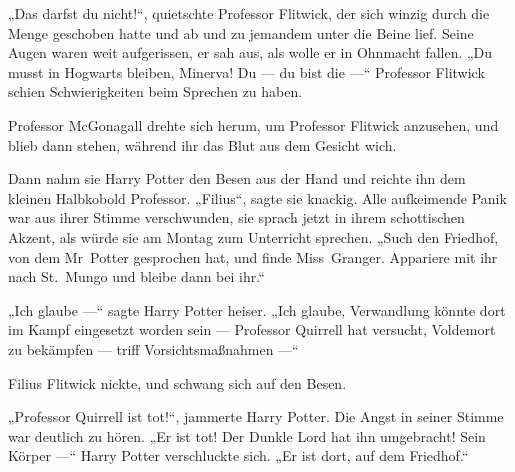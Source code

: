 „Das darfst du nicht!“, quietschte Professor Flitwick, der sich winzig durch die Menge geschoben hatte und ab und zu jemandem unter die Beine lief. Seine Augen waren weit aufgerissen, er sah aus, als wolle er in Ohnmacht fallen.
„Du musst in Hogwarts bleiben, Minerva! Du — du bist die —“
Professor Flitwick schien Schwierigkeiten beim Sprechen zu haben.

Professor McGonagall drehte sich herum, um Professor Flitwick anzusehen, und blieb dann stehen, während ihr das Blut aus dem Gesicht wich.

Dann nahm sie Harry Potter den Besen aus der Hand und reichte ihn dem kleinen Halbkobold Professor.
„Filius“, sagte sie knackig.
Alle aufkeimende Panik war aus ihrer Stimme verschwunden, sie sprach jetzt in ihrem schottischen Akzent, als würde sie am Montag zum Unterricht sprechen.
„Such den Friedhof, von dem Mr~Potter gesprochen hat, und finde Miss~Granger. Appariere mit ihr nach St.~Mungo und bleibe dann bei ihr.“

„Ich glaube —“ sagte Harry Potter heiser.
„Ich glaube, Verwandlung könnte dort im Kampf eingesetzt worden sein — Professor Quirrell hat versucht, Voldemort zu bekämpfen — triff Vorsichtsmaßnahmen —“

Filius Flitwick nickte, und schwang sich auf den Besen.

„Professor Quirrell ist tot!“, jammerte Harry Potter. Die Angst in seiner Stimme war deutlich zu hören.
„Er ist tot! Der Dunkle Lord hat ihn umgebracht! Sein Körper —“ Harry Potter verschluckte sich.
„Er ist dort, auf dem Friedhof.“

